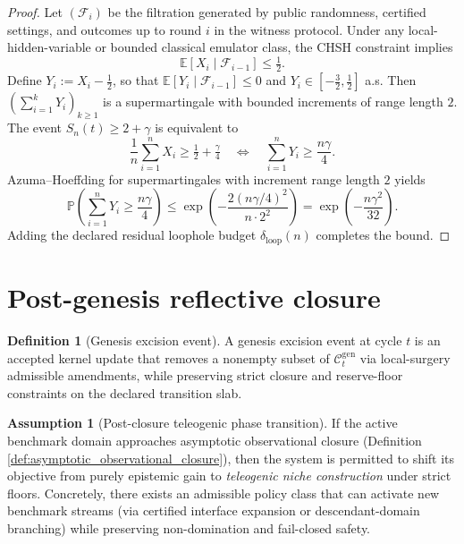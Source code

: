 \documentclass[11pt,a4paper]{article}
\newcommand{\E}{\mathbb{E}}
\newcommand{\Prob}{\mathbb{P}}
\theoremstyle{definition}
\newtheorem{definition}{Definition}
\newtheorem{assumption}{Assumption}
\theoremstyle{remark}
\begin{document}
\begin{proof}
Let $(\mathcal F_i)$ be the filtration generated by public randomness, certified settings, and outcomes up to round $i$ in the witness protocol.
Under any local-hidden-variable or bounded classical emulator class, the CHSH constraint implies
\[
\E[X_i\mid \mathcal F_{i-1}]\le \tfrac12.
\]
Define $Y_i:=X_i-\tfrac12$, so that $\E[Y_i\mid \mathcal F_{i-1}]\le 0$ and $Y_i\in[-\tfrac32,\tfrac12]$ a.s.
Then $(\sum_{i=1}^{k}Y_i)_{k\ge 1}$ is a supermartingale with bounded increments of range length $2$.
The event $\widehat S_n(t)\ge 2+\gamma$ is equivalent to
\[
\frac{1}{n}\sum_{i=1}^{n}X_i \ge \tfrac12+\tfrac{\gamma}{4}
\quad\Longleftrightarrow\quad
\sum_{i=1}^{n}Y_i \ge \frac{n\gamma}{4}.
\]
Azuma--Hoeffding for supermartingales with increment range length $2$ yields
\[
\Prob\!\left(\sum_{i=1}^{n}Y_i \ge \frac{n\gamma}{4}\right)
\le \exp\!\left(-\frac{2(n\gamma/4)^2}{n\cdot 2^2}\right)
=
\exp\!\left(-\frac{n\gamma^2}{32}\right).
\]
Adding the declared residual loophole budget $\delta_{\mathrm{loop}}(n)$ completes the bound.
\end{proof}


\section{Post-genesis reflective closure}
\begin{definition}[Genesis excision event]\label{def:genesis_excision_event}
A genesis excision event at cycle $t$ is an accepted kernel update that removes a nonempty subset of $\mathcal C_t^{\mathrm{gen}}$ via local-surgery admissible amendments, while preserving strict closure and reserve-floor constraints on the declared transition slab.
\end{definition}



\begin{assumption}[Post-closure teleogenic phase transition]\label{ass:postepistemic}
If the active benchmark domain approaches asymptotic observational closure (Definition \ref{def:asymptotic_observational_closure}), then the system is permitted to shift its objective from purely epistemic gain to \emph{teleogenic niche construction} under strict floors.
Concretely, there exists an admissible policy class that can activate new benchmark streams (via certified interface expansion or descendant-domain branching) while preserving non-domination and fail-closed safety.
\end{assumption}
\end{document}
